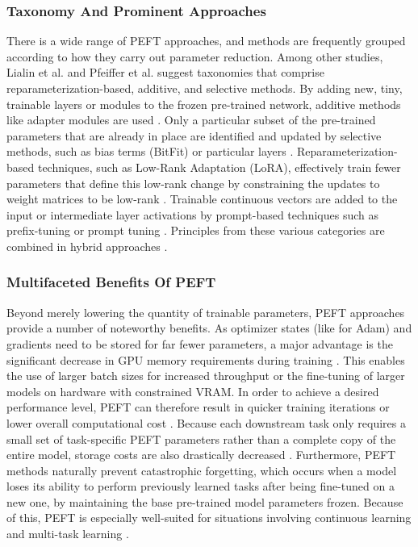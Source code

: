 \documentclass{DESSThesis}
\begin{document}
\subsubsection{Taxonomy And Prominent Approaches}
There is a wide range of PEFT approaches, and methods are frequently grouped according to how they carry out parameter reduction. Among other studies, Lialin et al. and Pfeiffer et al. suggest taxonomies that comprise reparameterization-based, additive, and selective methods. By adding new, tiny, trainable layers or modules to the frozen pre-trained network, additive methods like adapter modules are used \cite{lialin_scaling_2023,pfeiffer_modular_2024,houlsby_parameter-efficient_2019,poth_adapters_2023}. Only a particular subset of the pre-trained parameters that are already in place are identified and updated by selective methods, such as bias terms (BitFit) or particular layers \cite{lialin_scaling_2023}. Reparameterization-based techniques, such as Low-Rank Adaptation (LoRA), effectively train fewer parameters that define this low-rank change by constraining the updates to weight matrices to be low-rank \cite{hu_lora_2021,lialin_scaling_2023}. Trainable continuous vectors are added to the input or intermediate layer activations by prompt-based techniques such as prefix-tuning or prompt tuning \cite{pfeiffer_modular_2024,hu_llm-adapters_2023}. Principles from these various categories are combined in hybrid approaches \cite{lialin_scaling_2023,poth_adapters_2023}.

\subsubsection{Multifaceted Benefits Of PEFT}
Beyond merely lowering the quantity of trainable parameters, PEFT approaches provide a number of noteworthy benefits. As optimizer states (like for Adam) and gradients need to be stored for far fewer parameters, a major advantage is the significant decrease in GPU memory requirements during training \cite{lialin_scaling_2023,hu_lora_2021}. This enables the use of larger batch sizes for increased throughput or the fine-tuning of larger models on hardware with constrained VRAM. In order to achieve a desired performance level, PEFT can therefore result in quicker training iterations or lower overall computational cost \cite{hu_lora_2021,hayou_lora_2024}. Because each downstream task only requires a small set of task-specific PEFT parameters rather than a complete copy of the entire model, storage costs are also drastically decreased \cite{houlsby_parameter-efficient_2019,hu_lora_2021}. Furthermore, PEFT methods naturally prevent catastrophic forgetting, which occurs when a model loses its ability to perform previously learned tasks after being fine-tuned on a new one, by maintaining the base pre-trained model parameters frozen. Because of this, PEFT is especially well-suited for situations involving continuous learning and multi-task learning \cite{houlsby_parameter-efficient_2019,ruder_modular_2022,su_unlocking_2024}.
\end{document}
